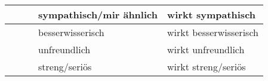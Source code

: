 \begin{longtable}{|l|l|l|l|l|l|}
     &                    &            & \multicolumn{2}{l|}{sympathisch/mir ähnlich}                & wirkt   sympathisch                                                                                                                                                                                                                                                                                                                                                                                                                                                                                                                                                                                                                                                                                     \\ \hline
     &                    &            & \multicolumn{2}{l|}{besserwisserisch}                       & wirkt   besserwisserisch                                                                                                                                                                                                                                                                                                                                                                                                                                                                                                                                                                                                                                                                                \\ \hline
     &                    &            & \multicolumn{2}{l|}{unfreundlich}                           & wirkt   unfreundlich                                                                                                                                                                                                                                                                                                                                                                                                                                                                                                                                                                                                                                                                                    \\ \hline
     &                    &            & \multicolumn{2}{l|}{streng/seriös}                          & wirkt   streng/seriös                                                                                                                                                                                                                                                                                                                                                                                                                                                                                                                                                                                                                                                                                   \\ \hline

\end{longtable}
